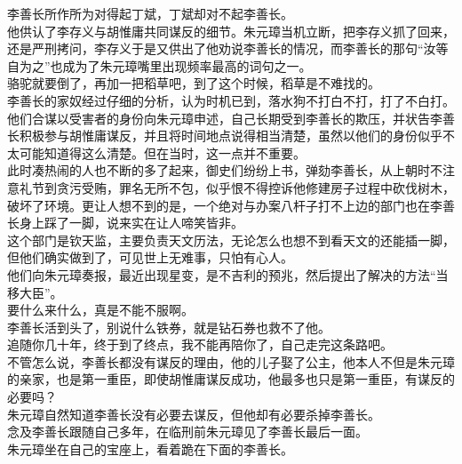 \begin{multicols}{\theparacolNo}
李善长所作所为对得起丁斌，丁斌却对不起李善长。\\

他供认了李存义与胡惟庸共同谋反的细节。朱元璋当机立断，把李存义抓了回来，还是严刑拷问，李存义于是又供出了他劝说李善长的情况，而李善长的那句“汝等自为之”也成为了朱元璋嘴里出现频率最高的词句之一。\\

骆驼就要倒了，再加一把稻草吧，到了这个时候，稻草是不难找的。\\

李善长的家奴经过仔细的分析，认为时机已到，落水狗不打白不打，打了不白打。他们合谋以受害者的身份向朱元璋申述，自己长期受到李善长的欺压，并状告李善长积极参与胡惟庸谋反，并且将时间地点说得相当清楚，虽然以他们的身份似乎不太可能知道得这么清楚。但在当时，这一点并不重要。\\

此时凑热闹的人也不断的多了起来，御史们纷纷上书，弹劾李善长，从上朝时不注意礼节到贪污受贿，罪名无所不包，似乎恨不得控诉他修建房子过程中砍伐树木，破坏了环境。更让人想不到的是，一个绝对与办案八杆子打不上边的部门也在李善长身上踩了一脚，说来实在让人啼笑皆非。\\

这个部门是钦天监，主要负责天文历法，无论怎么也想不到看天文的还能插一脚，但他们确实做到了，可见世上无难事，只怕有心人。\\

他们向朱元璋奏报，最近出现星变，是不吉利的预兆，然后提出了解决的方法“当移大臣”。\\

要什么来什么，真是不能不服啊。\\

李善长活到头了，别说什么铁券，就是钻石券也救不了他。\\

追随你几十年，终于到了终点，我不能再陪你了，自己走完这条路吧。\\

不管怎么说，李善长都没有谋反的理由，他的儿子娶了公主，他本人不但是朱元璋的亲家，也是第一重臣，即使胡惟庸谋反成功，他最多也只是第一重臣，有谋反的必要吗？\\

朱元璋自然知道李善长没有必要去谋反，但他却有必要杀掉李善长。\\

念及李善长跟随自己多年，在临刑前朱元璋见了李善长最后一面。\\

朱元璋坐在自己的宝座上，看着跪在下面的李善长。\\


\end{multicols}

